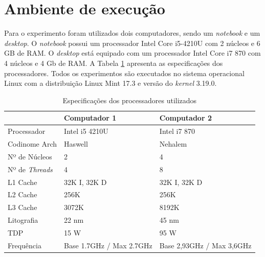 \documentclass[conference]{IEEEtran}
\begin{document}
    
    \section{Ambiente de execução}
    
    Para o experimento foram utilizados dois computadores, sendo um \textit{notebook} e um \textit{desktop}. O \textit{notebook} possui um processador Intel Core i5-4210U \cite{inteli5} com 2 núcleos e 6 GB de RAM. O \textit{desktop} está equipado com um processador Intel Core i7 870 com 4 núcleos e 4 Gb de RAM. A Tabela \ref{tab:processadores} apresenta as especificações dos processadores. Todos os experimentos são executados no sistema operacional  Linux com a distribuição Linux Mint 17.3 e versão do \textit{kernel} 3.19.0.
        
        
        \begin{table}[ht]
            \caption{Especificações dos processadores utilizados \cite{inteli5} \cite{inteli7}}
            \begin{center}
                \begin{tabular}{l|l|l}
                    \hline
                    & Computador 1  & Computador 2 \\
                    \hline
                    Processador & Intel i5 4210U  & Intel i7 870 \\
                    \hline
                    Codinome Arch & Haswell  & Nehalem \\
                    \hline
                    Nº de Núcleos & 2 & 4\\
                    \hline
                    Nº de \textit{Threads} & 4 & 8\\
                    \hline
                    L1 Cache & 32K I, 32K D & 32K I, 32K D\\
                    \hline
                    L2 Cache & 256K & 256K\\
                    \hline
                    L3 Cache & 3072K & 8192K\\
                    \hline
                    Litografia & 22 nm & 45 nm\\
                    \hline
                    TDP & 15 W & 95 W\\
                    \hline
                    Frequência & Base 1.7GHz / Max 2.7GHz & Base 2,93GHz / Max 3,6GHz\\
                    \hline
                \end{tabular}
            \end{center}
            \label{tab:processadores}
        \end{table}        
    
\end{document}
